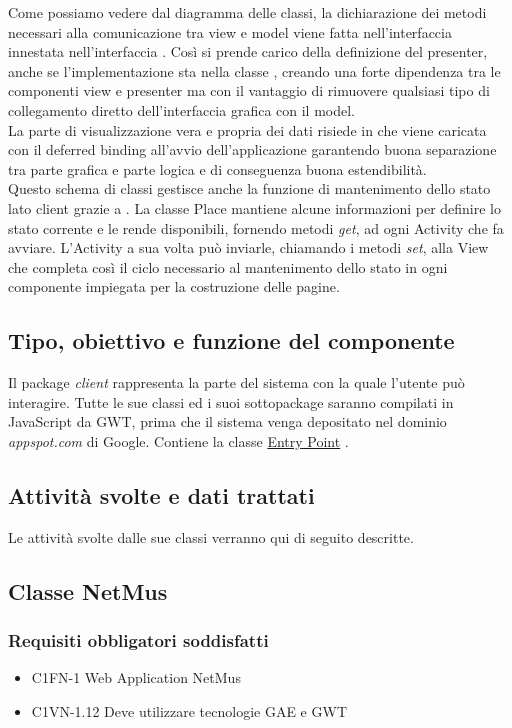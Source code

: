 Come possiamo vedere dal diagramma delle classi, la dichiarazione dei metodi
necessari alla comunicazione tra view e model viene fatta nell'interfaccia 
 innestata nell'interfaccia . Cos\`i 
si prende carico della definizione del presenter, anche se l'implementazione sta
nella classe , creando una forte dipendenza tra le componenti view e
presenter ma con il vantaggio di rimuovere qualsiasi tipo di collegamento
diretto dell'interfaccia grafica con il model.\\
La parte di visualizzazione vera e propria dei dati risiede in
 che viene caricata con il deferred binding all'avvio
dell'applicazione garantendo buona separazione tra parte grafica e parte logica
e di conseguenza buona estendibilit\`a.\\
Questo schema di classi gestisce
anche la funzione di mantenimento dello stato lato client grazie a
. La classe Place mantiene alcune informazioni per definire lo
stato corrente e le rende disponibili, fornendo metodi \emph{get}, ad ogni
Activity che fa avviare. L'Activity a sua volta pu\`o inviarle, chiamando i
metodi \emph{set}, alla View che completa cos\`i il ciclo necessario al
mantenimento dello stato in ogni componente impiegata per la costruzione delle pagine.

\subsection*{Tipo, obiettivo e funzione del componente} %
Il package \emph{client} rappresenta la parte del sistema con la quale l'utente
pu\`o interagire. Tutte le sue classi ed i suoi sottopackage saranno compilati in
JavaScript da GWT, prima che il sistema venga depositato nel dominio
\emph{appspot.com} di Google. Contiene la classe \underline{Entry Point}
.
\subsection*{Attivit\`a svolte e dati trattati}
Le attivit\`a svolte dalle sue classi verranno qui di seguito descritte.

\subsection{Classe NetMus}
\subsubsection*{Requisiti obbligatori soddisfatti}
\begin{itemize}
	\item C1FN-1 Web Application NetMus
	\item C1VN-1.12 Deve utilizzare tecnologie GAE e GWT
\end{itemize}
